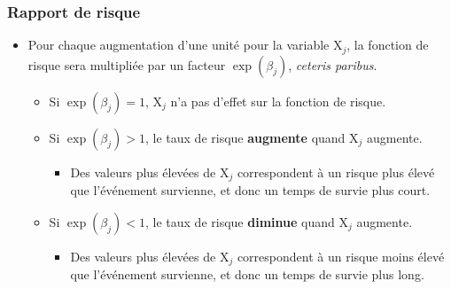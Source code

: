 \documentclass{beamer}
\begin{document}
\begin{frame}
\frametitle{Rapport de risque}
\begin{itemize}
\item Pour chaque augmentation d'une unité pour la variable $\mathrm{X}_j$, la fonction de risque sera \alert{multipliée} par un facteur $\exp(\beta_j)$, \textit{ceteris paribus}.
\begin{itemize}
\vp \vp
\item Si $\exp(\beta_j)=1$,  $\mathrm{X}_j$ n'a pas d'effet sur la fonction de risque.
\item Si $\exp(\beta_j)>1$, le taux de risque \textbf{augmente} quand $\mathrm{X}_j$ augmente. 
\begin{itemize}
\vp \vp
\item Des valeurs plus élevées de $\mathrm{X}_j$ correspondent à un risque plus élevé que l'événement survienne, et donc un temps de survie plus court.
\end{itemize}
\item Si $\exp(\beta_j)<1$, le taux de risque \textbf{diminue} quand $\mathrm{X}_j$ augmente. 
\begin{itemize}
\vp \vp
\item Des valeurs plus élevées de $\mathrm{X}_j$ correspondent à un risque moins élevé que l'événement survienne, et donc un temps de survie plus long.
\end{itemize}
\end{itemize}
\end{itemize}
\end{frame}
\end{document}
